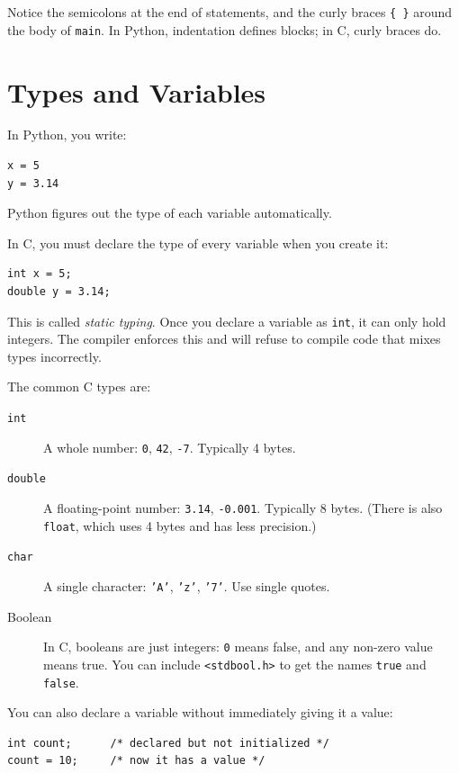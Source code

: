 Notice the semicolons at the end of statements, and the curly braces
\texttt{\{ \}} around the body of \texttt{main}.  In Python, indentation
defines blocks; in C, curly braces do.

\section{Types and Variables}

In Python, you write:

\begin{verbatim}
x = 5
y = 3.14
\end{verbatim}

Python figures out the type of each variable automatically.

In C, you must declare the type of every variable when you create it:

\begin{verbatim}
int x = 5;
double y = 3.14;
\end{verbatim}

This is called \emph{static typing}.  Once you
declare a variable as \texttt{int}, it can only hold integers.  The
compiler enforces this and will refuse to compile code that mixes types
incorrectly.

The common C types are:

\begin{description}
\item[\texttt{int}] A whole number: \texttt{0}, \texttt{42},
  \texttt{-7}.  Typically 4 bytes.
\item[\texttt{double}] A floating-point number: \texttt{3.14},
  \texttt{-0.001}.  Typically 8 bytes.  (There is also \texttt{float},
  which uses 4 bytes and has less precision.)
\item[\texttt{char}] A single character: \texttt{'A'}, \texttt{'z'},
  \texttt{'7'}.  Use single quotes.
\item[Boolean] In C, booleans are just integers: \texttt{0} means
  false, and any non-zero value means true.  You can include
  \texttt{<stdbool.h>} to get the names \texttt{true} and \texttt{false}.
\end{description}

You can also declare a variable without immediately giving it a value:

\begin{verbatim}
int count;      /* declared but not initialized */
count = 10;     /* now it has a value */
\end{verbatim}

